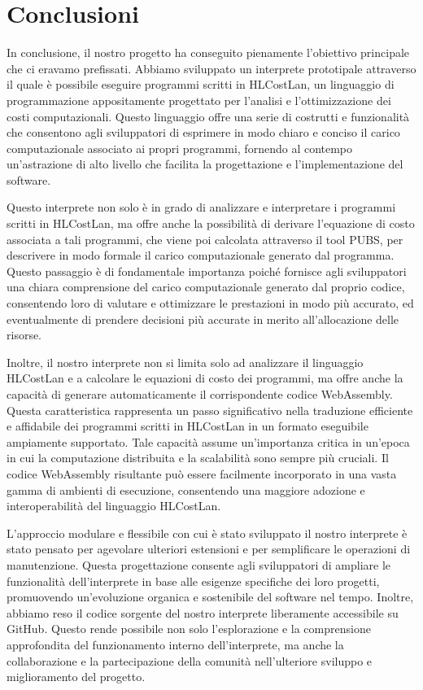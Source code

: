 \documentclass[../../main.tex]{subfiles}
\begin{document}
\chapter{Conclusioni}
In conclusione, il nostro progetto ha conseguito pienamente l'obiettivo principale che ci eravamo prefissati. Abbiamo sviluppato un interprete prototipale attraverso il quale è possibile eseguire programmi scritti in HLCostLan, un linguaggio di programmazione appositamente progettato per l'analisi e l'ottimizzazione dei costi computazionali. Questo linguaggio offre una serie di costrutti e funzionalità che consentono agli sviluppatori di esprimere in modo chiaro e conciso il carico computazionale associato ai propri programmi, fornendo al contempo un'astrazione di alto livello che facilita la progettazione e l'implementazione del software.

Questo interprete non solo è in grado di analizzare e interpretare i programmi scritti in HLCostLan, ma offre anche la possibilità di derivare l'equazione di costo associata a tali programmi, che viene poi calcolata attraverso il tool PUBS, per descrivere in modo formale il carico computazionale generato dal programma. Questo passaggio è di fondamentale importanza poiché fornisce agli sviluppatori una chiara comprensione del carico computazionale generato dal proprio codice, consentendo loro di valutare e ottimizzare le prestazioni in modo più accurato, ed eventualmente di prendere decisioni più accurate in merito all'allocazione delle risorse.

Inoltre, il nostro interprete non si limita solo ad analizzare il linguaggio HLCostLan e a calcolare le equazioni di costo dei programmi, ma offre anche la capacità di generare automaticamente il corrispondente codice WebAssembly. Questa caratteristica rappresenta un passo significativo nella traduzione efficiente e affidabile dei programmi scritti in HLCostLan in un formato eseguibile ampiamente supportato. Tale capacità assume un'importanza critica in un'epoca in cui la computazione distribuita e la scalabilità sono sempre più cruciali. Il codice WebAssembly risultante può essere facilmente incorporato in una vasta gamma di ambienti di esecuzione, consentendo una maggiore adozione e interoperabilità del linguaggio HLCostLan.

L'approccio modulare e flessibile con cui è stato sviluppato il nostro interprete è stato pensato per agevolare ulteriori estensioni e per semplificare le operazioni di manutenzione. Questa progettazione consente agli sviluppatori di ampliare le funzionalità dell'interprete in base alle esigenze specifiche dei loro progetti, promuovendo un'evoluzione organica e sostenibile del software nel tempo. Inoltre, abbiamo reso il codice sorgente del nostro interprete liberamente accessibile su GitHub. Questo rende possibile non solo l'esplorazione e la comprensione approfondita del funzionamento interno dell'interprete, ma anche la collaborazione e la partecipazione della comunità nell'ulteriore sviluppo e miglioramento del progetto.
\end{document}
